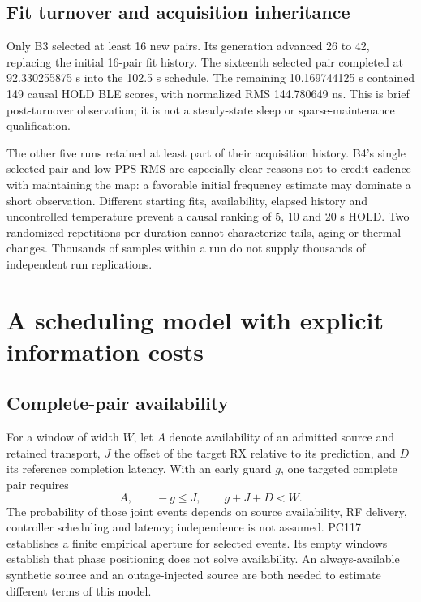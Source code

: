 \documentclass[11pt,letterpaper]{article}
\begin{document}
\subsection{Fit turnover and acquisition inheritance}
Only B3 selected at least 16 new pairs. Its generation advanced 26 to 42, replacing the initial 16-pair fit history. The sixteenth selected pair completed at 92.330255875 s into the 102.5 s schedule. The remaining 10.169744125 s contained 149 causal HOLD BLE scores, with normalized RMS 144.780649 ns. This is brief post-turnover observation; it is not a steady-state sleep or sparse-maintenance qualification.

The other five runs retained at least part of their acquisition history. B4's single selected pair and low PPS RMS are especially clear reasons not to credit cadence with maintaining the map: a favorable initial frequency estimate may dominate a short observation. Different starting fits, availability, elapsed history and uncontrolled temperature prevent a causal ranking of 5, 10 and 20 s HOLD. Two randomized repetitions per duration cannot characterize tails, aging or thermal changes. Thousands of samples within a run do not supply thousands of independent run replications.

\section{A scheduling model with explicit information costs}\label{sec:scheduling}
\subsection{Complete-pair availability}
For a window of width $W$, let $A$ denote availability of an admitted source and retained transport, $J$ the offset of the target RX relative to its prediction, and $D$ its reference completion latency. With an early guard $g$, one targeted complete pair requires
\begin{equation}
 A,\qquad -g\le J,\qquad g+J+D<W.\label{eq:probability}
\end{equation}
The probability of those joint events depends on source availability, RF delivery, controller scheduling and latency; independence is not assumed. PC117 establishes a finite empirical aperture for selected events. Its empty windows establish that phase positioning does not solve availability. An always-available synthetic source and an outage-injected source are both needed to estimate different terms of this model.
\end{document}
